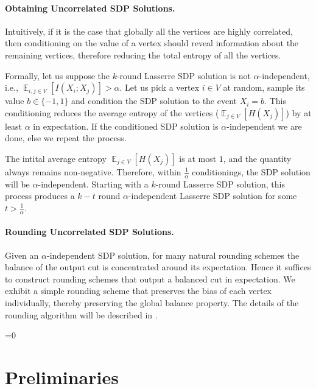 \documentclass[11pt]{article}
\def\full{1}
\theoremstyle{definition}
\newcommand{\Esymb}{\mathbb{E}}
\DeclareMathOperator*{\E}{\Esymb}
\numberwithin{equation}{section}
\let\origparagraph\paragraph
\renewcommand{\paragraph}[1]{\origparagraph{#1.}}
\let\pref=\prettyref
\begin{document}
\paragraph{Obtaining Uncorrelated SDP Solutions}



Intuitively, if it is the case that globally all the vertices are
highly correlated, then conditioning on the value of a vertex should
reveal information about the remaining vertices, therefore reducing
the total entropy of all the vertices.

Formally, let us suppose the $k$-round Lasserre SDP solution is not
$\alpha$-independent, i.e.,  $\E_{i,j \in V}[I(X_i;X_j)] > \alpha$.
Let us pick a vertex $i \in V$ at random, sample its value $b \in
\{-1,1\}$ and condition the SDP
solution to the event $X_i = b$.  This conditioning reduces the
average entropy of the vertices ($\E_{j \in V}[H(X_j)]$) by at least
$\alpha$ in expectation.  If the conditioned SDP solution is
$\alpha$-independent we are done, else we repeat the process.

The intital average entropy $\E_{j \in V}[H(X_j)]$ is at most $1$, and
the quantity always remains non-negative.  Therefore, within
$\frac{1}{\alpha}$ conditionings, the SDP solution will be
$\alpha$-independent.  Starting with a $k$-round Lasserre SDP
solution, this process produces a $k-t$ round $\alpha$-independent Lasserre
SDP solution for some $t > \frac{1}{\alpha}$.








\paragraph{Rounding Uncorrelated SDP Solutions}
Given an $\alpha$-independent SDP solution, for many natural rounding
schemes the balance of the output cut is concentrated around its
expectation.  Hence it suffices to construct rounding schemes that
output a balanced cut in expectation.  We exhibit a simple rounding
scheme that preserves the bias of each vertex individually, thereby
preserving the global balance property.   The details of the rounding algorithm will be described in \pref{sec:rounding}.

\ifnum\full=0 \vspace{-8pt}\fi
\section{Preliminaries} \label{sec:prelim}
\end{document}

